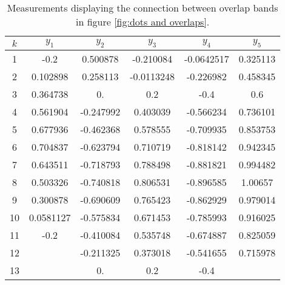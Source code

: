 \begin{table}
    \begin{tabular}{SS[table-format=-1.6]S[table-format=-1.6]S[table-format=-1.6]S[table-format=-1.6]S[table-format=-1.6]}
    $k$ & $y_{1}$ & $y_{2}$ & $y_{3}$ & $y_{4}$ & $y_{5}$ \\ & \color{medgray}-0.2     & 0.500878                 & \color{blue}-0.210084   & -0.0642517               & \color{blue}0.325113 \\
  2 & \color{medgray}0.102898 & 0.258113                 & \color{blue}-0.0113248  & -0.226982                & \color{blue}0.458345 \\
  3 & \color{medgray}0.364738 & 0.                       & \color{blue}0.2         & -0.4                     & \color{blue}0.6 \\
  4 & \color{medgray}0.561904 & \color{medgray}-0.247992 & \color{medgray}0.403039 & \color{medgray}-0.566234 & \color{medgray}0.736101 \\
  5 & \color{medgray}0.677936 & \color{medgray}-0.462368 & \color{medgray}0.578555 & \color{medgray}-0.709935 & \color{medgray}0.853753 \\
  6 & \color{medgray}0.704837 & \color{medgray}-0.623794 & \color{medgray}0.710719 & \color{medgray}-0.818142 & \color{medgray}0.942345 \\
  7 & \color{medgray}0.643511 & \color{medgray}-0.718793 & \color{medgray}0.788498 & \color{medgray}-0.881821 & \color{medgray}0.994482 \\
  8 & \color{medgray}0.503326 & \color{medgray}-0.740818 & \color{medgray}0.806531 & \color{medgray}-0.896585 & \color{medgray}1.00657 \\
  9 & 0.300878                & \color{medgray}-0.690609 & \color{medgray}0.765423 & \color{medgray}-0.862929 & \color{medgray}0.979014 \\
 10 & 0.0581127               & \color{medgray}-0.575834 & \color{medgray}0.671453 & \color{medgray}-0.785993 & \color{medgray}0.916025 \\
 11 & -0.2                    & \color{blue}-0.410084    & 0.535748                & \color{blue}-0.674887    & \color{medgray}0.825059 \\
 12 &                         & \color{blue}-0.211325    & 0.373018                & \color{blue}-0.541655    & \color{medgray}0.715978 \\
 13 &                         & \color{blue}0.           & 0.2                     & \color{blue}-0.4 
    \end{tabular}
	\caption{Measurements displaying the connection between overlap bands in figure \ref{fig:dots and overlaps}.}
	\label{tab:stitch measurements}
\end{table} 

